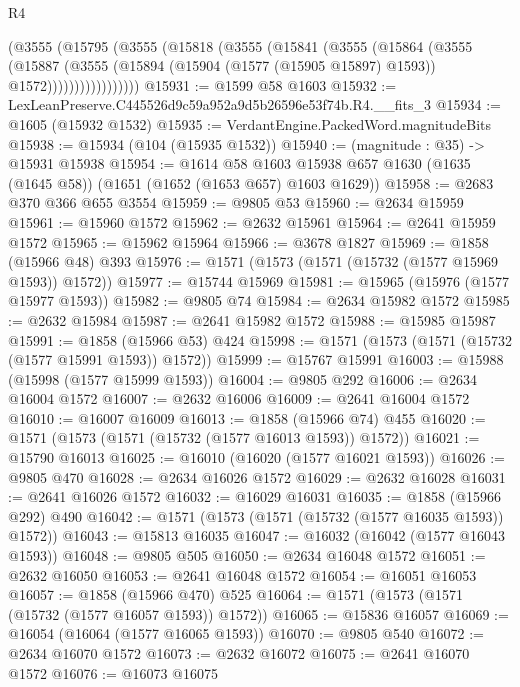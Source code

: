 \begin{lexlean}{R4}
\begin{coremodule}
              (@3555
                (@15795
                  (@3555
                    (@15818
                      (@3555
                        (@15841
                          (@3555
                            (@15864
                              (@3555
                                (@15887
                                  (@3555
                                    (@15894
                                      (@15904 (@1577 (@15905 @15897) @1593))
                                      @1572)))))))))))))))))
@15931 := @1599 @58 @1603
@15932 := LexLeanPreserve.C445526d9c59a952a9d5b26596e53f74b.R4.__fits_3
@15934 := @1605 (@15932 @1532)
@15935 := VerdantEngine.PackedWord.magnitudeBits
@15938 := @15934 (@104 (@15935 @1532))
@15940 := (magnitude : @35) -> @15931 @15938
@15954 := @1614
    @58
    @1603
    @15938
    @657
    @1630
    (@1635 (@1645 @58))
    (@1651 (@1652 (@1653 @657) @1603 @1629))
@15958 := @2683 @370 @366 @655 @3554
@15959 := @9805 @53
@15960 := @2634 @15959
@15961 := @15960 @1572
@15962 := @2632 @15961
@15964 := @2641 @15959 @1572
@15965 := @15962 @15964
@15966 := @3678 @1827
@15969 := @1858 (@15966 @48) @393
@15976 := @1571 (@1573 (@1571 (@15732 (@1577 @15969 @1593)) @1572))
@15977 := @15744 @15969
@15981 := @15965 (@15976 (@1577 @15977 @1593))
@15982 := @9805 @74
@15984 := @2634 @15982 @1572
@15985 := @2632 @15984
@15987 := @2641 @15982 @1572
@15988 := @15985 @15987
@15991 := @1858 (@15966 @53) @424
@15998 := @1571 (@1573 (@1571 (@15732 (@1577 @15991 @1593)) @1572))
@15999 := @15767 @15991
@16003 := @15988 (@15998 (@1577 @15999 @1593))
@16004 := @9805 @292
@16006 := @2634 @16004 @1572
@16007 := @2632 @16006
@16009 := @2641 @16004 @1572
@16010 := @16007 @16009
@16013 := @1858 (@15966 @74) @455
@16020 := @1571 (@1573 (@1571 (@15732 (@1577 @16013 @1593)) @1572))
@16021 := @15790 @16013
@16025 := @16010 (@16020 (@1577 @16021 @1593))
@16026 := @9805 @470
@16028 := @2634 @16026 @1572
@16029 := @2632 @16028
@16031 := @2641 @16026 @1572
@16032 := @16029 @16031
@16035 := @1858 (@15966 @292) @490
@16042 := @1571 (@1573 (@1571 (@15732 (@1577 @16035 @1593)) @1572))
@16043 := @15813 @16035
@16047 := @16032 (@16042 (@1577 @16043 @1593))
@16048 := @9805 @505
@16050 := @2634 @16048 @1572
@16051 := @2632 @16050
@16053 := @2641 @16048 @1572
@16054 := @16051 @16053
@16057 := @1858 (@15966 @470) @525
@16064 := @1571 (@1573 (@1571 (@15732 (@1577 @16057 @1593)) @1572))
@16065 := @15836 @16057
@16069 := @16054 (@16064 (@1577 @16065 @1593))
@16070 := @9805 @540
@16072 := @2634 @16070 @1572
@16073 := @2632 @16072
@16075 := @2641 @16070 @1572
@16076 := @16073 @16075

\end{coremodule}
\end{lexlean}
